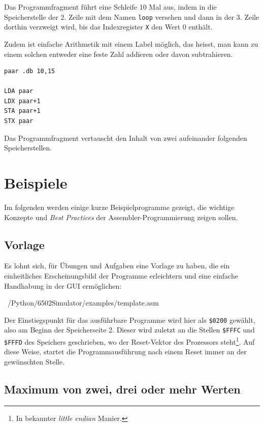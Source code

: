 \documentclass[11pt]{scrartcl}
\newcommand{\hex}[1]{\texttt{\$#1}}
\begin{document}
Das Programmfragment führt eine Schleife 10 Mal aus, indem in die
Speicherstelle der 2. Zeile mit dem Namen \lstinline!loop! versehen
und dann in der 3. Zeile dorthin verzweigt wird, bis das Indexregister
\lstinline!X! den Wert 0 enthält.

Zudem ist einfache Arithmetik mit einem Label möglich, das heisst, man
kann zu einem solchen entweder eine feste Zahl addieren oder davon
subtrahieren.


\begin{center}
\begin{lstlisting}[caption={Assembler, Beispiel 3}, label=asmbeisp3]
paar .db 10,15

LDA paar
LDX paar+1
STA paar+1
STX paar
\end{lstlisting}
\end{center}

Das Programmfragment vertauscht den Inhalt von zwei aufeinander
folgenden Speicherstellen.

\newpage
\section{Beispiele}
\label{sec:beispiele}

Im folgenden werden einige kurze Beispielprogramme gezeigt, die
wichtige Konzepte und \emph{Best Practices} der
Assembler-Programmierung zeigen sollen.

\subsection{Vorlage}
\label{sec:vorlage}

Es lohnt sich, für Übungen und Aufgaben eine Vorlage zu haben, die
ein einheitliches Erscheinungsbild der Programme erleichtern und eine
einfache Handhabung in der GUI ermöglichen:


{~/Python/6502Simulator/examples/template.asm}

Der Einstiegspunkt für das ausführbare Programme wird hier als
\hex{0200} gewählt, also am Beginn der Speicherseite 2. Dieser wird
zuletzt an die Stellen \hex{FFFC} und \hex{FFFD} des Speichers
geschrieben, wo der Reset-Vektor des Prozessors steht\footnote{In
  bekannter \emph{little endian} Manier.}. Auf diese Weise, startet
die Programmausführung nach einem Reset immer an der gewünschten
Stelle.



\subsection{Maximum von zwei, drei oder mehr Werten}
\label{sec:example_max}
\end{document}
